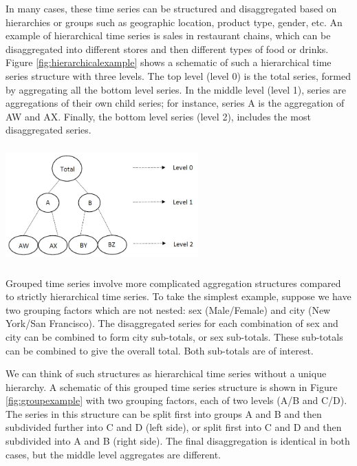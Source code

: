 \documentclass[11pt,a4paper,]{article}
\let\origfigure\figure
\let\endorigfigure\endfigure
\renewenvironment{figure}[1][2] {
    \expandafter\origfigure\expandafter[!htbp]
} {
    \endorigfigure
}
\begin{document}
In many cases, these time series can be structured and disaggregated based on hierarchies or groups such as geographic location, product type, gender, etc. An example of hierarchical time series is sales in restaurant chains, which can be disaggregated into different stores and then different types of food or drinks. Figure \ref{fig:hierarchicalexample} shows a schematic of such a hierarchical time series structure with three levels. The top level (level 0) is the total series, formed by aggregating all the bottom level series. In the middle level (level 1), series are aggregations of their own child series; for instance, series A is the aggregation of AW and AX. Finally, the bottom level series (level 2), includes the most disaggregated series.

\begin{figure}

{\centering \includegraphics[width=280px,height=170px]{Paper-Figures/hierarchical_example} 

}

\caption{An example of a two level hierarchical structure.}\label{fig:hierarchicalexample}
\end{figure}

Grouped time series involve more complicated aggregation structures compared to strictly hierarchical time series. To take the simplest example, suppose we have two grouping factors which are not nested: sex (Male/Female) and city (New York/San Francisco). The disaggregated series for each combination of sex and city can be combined to form city sub-totals, or sex sub-totals. These sub-totals can be combined to give the overall total. Both sub-totals are of interest.

We can think of such structures as hierarchical time series without a unique hierarchy. A schematic of this grouped time series structure is shown in Figure \ref{fig:groupexample} with two grouping factors, each of two levels (A/B and C/D). The series in this structure can be split first into groups A and B and then subdivided further into C and D (left side), or split first into C and D and then subdivided into A and B (right side). The final disaggregation is identical in both cases, but the middle level aggregates are different.
\end{document}
